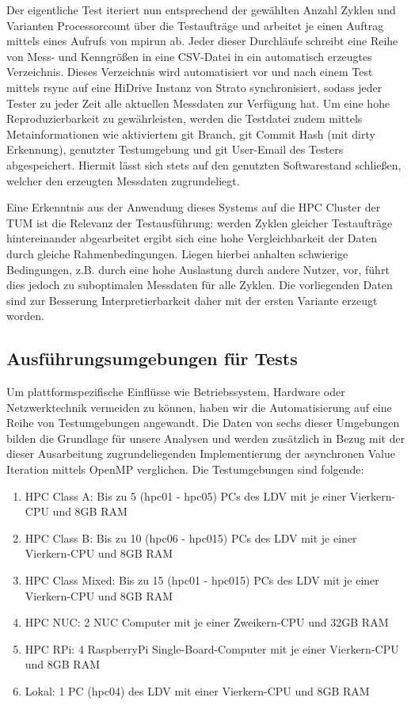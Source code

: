 Der eigentliche Test iteriert nun entsprechend der gewählten Anzahl Zyklen und Varianten Processorcount über die Testaufträge und arbeitet je einen Auftrag mittels eines Aufrufs von mpirun ab. Jeder dieser Durchläufe schreibt eine Reihe von Mess- und Kenngrößen in eine CSV-Datei in ein automatisch erzeugtes Verzeichnis. Dieses Verzeichnis wird automatisiert vor und nach einem Test mittels rsync auf eine HiDrive Instanz von Strato synchronisiert, sodass jeder Tester zu jeder Zeit alle aktuellen Messdaten zur Verfügung hat.
Um eine hohe Reproduzierbarkeit zu gewährleisten, werden die Testdatei zudem mittels Metainformationen wie aktiviertem git Branch, git Commit Hash (mit dirty Erkennung), genutzter Testumgebung und git User-Email des Testers abgespeichert. Hiermit lässt sich stets auf den genutzten Softwarestand schließen, welcher den erzeugten Messdaten zugrundeliegt.

Eine Erkenntnis aus der Anwendung dieses Systems auf die HPC Cluster der TUM ist die Relevanz der Testausführung: werden Zyklen gleicher Testaufträge hintereinander abgearbeitet ergibt sich eine hohe Vergleichbarkeit der Daten durch gleiche Rahmenbedingungen. Liegen hierbei anhalten schwierige Bedingungen, z.B. durch eine hohe Auslastung durch andere Nutzer, vor, führt dies jedoch zu suboptimalen Messdaten für alle Zyklen. Die vorliegenden Daten sind zur Besserung Interpretierbarkeit daher mit der ersten Variante erzeugt worden.

\subsection{Ausführungsumgebungen für Tests}
\label{ssec:ausfuehrungsumgebungen}
Um plattformspezifische Einflüsse wie Betriebssystem, Hardware oder Netzwerktechnik vermeiden zu können, haben wir die Automatisierung auf eine Reihe von Testumgebungen angewandt. Die Daten von sechs dieser Umgebungen bilden die Grundlage für unsere Analysen und werden zusätzlich in Bezug mit der dieser Ausarbeitung zugrundeliegenden Implementierung der asynchronen Value Iteration mittels OpenMP verglichen. Die Testumgebungen sind folgende:

\begin{enumerate}
	\item HPC Class A: Bis zu 5 (hpc01 - hpc05) PCs des LDV mit je einer Vierkern-CPU und 8GB RAM
	\item HPC Class B: Bis zu 10 (hpc06 - hpc015) PCs des LDV mit je einer Vierkern-CPU und 8GB RAM
	\item HPC Class Mixed: Bis zu 15 (hpc01 - hpc015) PCs des LDV mit je einer Vierkern-CPU und 8GB RAM
	\item HPC NUC: 2 NUC Computer mit je einer Zweikern-CPU und 32GB RAM
	\item HPC RPi: 4 RaspberryPi Single-Board-Computer mit je einer Vierkern-CPU und 8GB RAM
	\item Lokal: 1 PC (hpc04) des LDV mit einer Vierkern-CPU und 8GB RAM
\end{enumerate}

